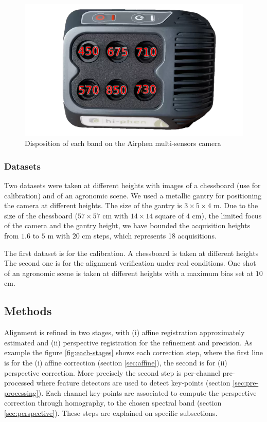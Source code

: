\documentclass[a4paper,twoside]{article}
\begin{document}
	\begin{figure}[h]
		\centering
		\includegraphics[width=0.6\linewidth]{../figures/airphen-detail4}
		\caption{Disposition of each band on the Airphen multi-sensors camera}
		\label{fig:bands-disposition}
	\end{figure}
	
	\subsubsection{Datasets}
	\par Two datasets were taken at different heights with images of a chessboard (use for calibration) and of an agronomic scene.
	We used a metallic gantry for positioning the camera at different heights.
	The size of the gantry is $3\times5\times4$ m.
	Due to the size of the chessboard ($57\times57$ cm with $14\times14$ square of $4$ cm), the limited focus of the camera and the gantry height,
	we have bounded the acquisition heights from $1.6$ to $5$ m with $20$ cm steps, which represents 18 acquisitions.
	\\
	\par The first dataset is for the calibration. A chessboard is taken at different heights %
	The second one is for the alignment verification under real conditions.
	One shot of an agronomic scene is taken at different heights %
	with a maximum bias set at $10$ cm. %
	
	\subsection{Methods}
	
	Alignment is refined in two stages, with (i) affine registration approximately estimated and (ii) perspective registration for the refinement and precision.
	As example the figure \ref{fig:each-stages} shows each correction step, where the first line is for the
	(i) affine correction (section \ref{sec:affine}), the second is for (ii) perspective correction.
	More precisely the second step is per-channel pre-processed where feature detectors are used to detect key-points (section \ref{sec:pre-processing}).
	Each channel key-points are associated to compute the perspective correction through homography, to the chosen spectral band (section \ref{sec:perspective}).
	These steps are explained on specific subsections.
	
\end{document}
